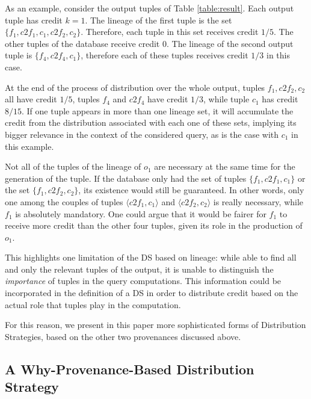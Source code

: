 As an example, consider the output tuples of Table \ref{table:result}.
Each output tuple has credit $k = 1$.
The lineage of the first tuple is the set $\{f_1, c2f_1, c_1, c2f_2, c_2\}$. Therefore, each tuple in this set receives credit $1/5$. The other tuples of the database receive credit 0.
The lineage of the second output tuple is $\{ f_4, c2f_4, c_1\}$, therefore each of these tuples receives credit $1/3$ in this case.

At the end of the process of distribution over the whole output, tuples $f_1, c2f_2, c_2$ all have credit $1/5$, tuples $f_4$ and $c2f_4$ have credit $1/3$, while tuple $c_1$ has credit $8/15$.  
If one tuple appears in more than one lineage set, it will accumulate the credit from the distribution associated with each one of these sets, implying its bigger relevance in the context of the considered query, as is the case with $c_1$ in this example.
 
Not all of the tuples of the lineage of $o_1$ are necessary at the same time for the generation of the tuple. 
If the database only had the set of  tuples $\{f_1, c2f_1, c_1\}$ or the set $\{f_1, c2f_2, c_2\}$, its existence would still be guaranteed. 
In other words, only one among the couples of tuples $\langle c2f_1, c_1 \rangle$ and $\langle c2f_2, c_2 \rangle$ is really necessary, while $f_1$ is absolutely mandatory. 
One could argue that it would be fairer for $f_1$ to receive more credit than the other four tuples, given its role in the production of $o_1$.  

This highlights one limitation of the DS based on lineage: while able to find all and only the relevant tuples of the output, it is unable to distinguish the \emph{importance} of tuples in the query computations. 
This information could be incorporated in the definition of a DS in order to distribute credit based on the actual role that tuples play in the computation. 

For this reason, we present in this paper more sophisticated forms of Distribution Strategies, based on the other two provenances discussed above.

\subsection{A Why-Provenance-Based Distribution Strategy}

